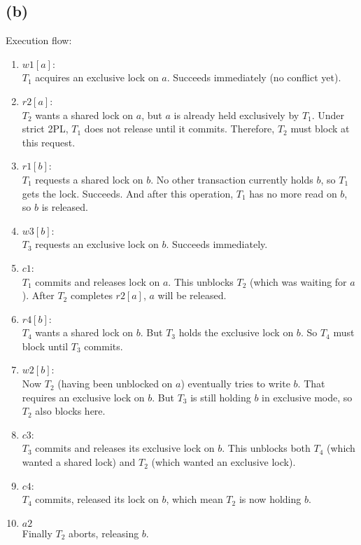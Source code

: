 \documentclass{article}
\begin{document}
\subsection*{(b)}
Execution flow:
\begin{enumerate}
  \item $w1[a]$:\\
        $T_1$ acquires an exclusive lock on $a$. Succeeds immediately (no conflict yet).
  \item $r2[a]$:\\
        $T_2$ wants a shared lock on $a$, but $a$ is already held exclusively by $T_1$. Under strict 2PL, $T_1$ does not release until it commits. Therefore, $T_2$ must block at this request.
  \item $r1[b]$:\\
        $T_1$ requests a shared lock on $b$. No other transaction currently holds $b$, so $T_1$ gets the lock. Succeeds. And after this operation, $T_1$ has no more read on $b$, so $b$ is released.
  \item $w3[b]$:\\
        $T_3$ requests an exclusive lock on $b$. Succeeds immediately.
  \item $c1$:\\
        $T_1$ commits and releases lock on $a$. This unblocks $T_2$ (which was waiting for $a$). After $T_2$ completes $r2[a]$, $a$ will be released.
  \item $r4[b]$:\\
        $T_4$ wants a shared lock on $b$. But $T_3$ holds the exclusive lock on $b$. So $T_4$ must block until $T_3$ commits.
  \item $w2[b]$:\\
        Now $T_2$ (having been unblocked on $a$) eventually tries to write $b$. That requires an exclusive lock on $b$. But $T_3$ is still holding $b$ in exclusive mode, so $T_2$ also blocks here.
  \item $c3$:\\
        $T_3$ commits and releases its exclusive lock on $b$. This unblocks both $T_4$ (which wanted a shared lock) and $T_2$ (which wanted an exclusive lock).
  \item $c4$:\\
        $T_4$ commits, released its lock on $b$, which mean $T_2$ is now holding $b$.
  \item $a2$\\
        Finally $T_2$ aborts, releasing $b$.
\end{enumerate}
\end{document}
